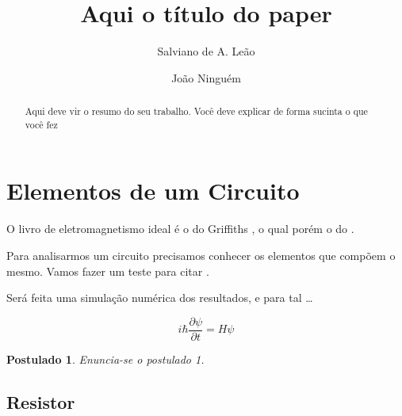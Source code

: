 \documentclass[10pt,a4paper,twocolumn,showkeys,showpacs,aps,groupedaddress,noeprint]{revtex4-1}
\newtheorem{postulado}{Postulado}
\begin{document}
\title{Aqui o título do paper}
\author{Salviano de A. Leão}
\author{João Ninguém}

\begin{abstract}
   Aqui deve vir o resumo do seu trabalho. Você deve explicar
   de forma sucinta o que você fez
\end{abstract}


\maketitle

\section{Elementos de um Circuito}

\lipsum[1]

O livro de eletromagnetismo ideal é o do Griffiths 
\cite{GriffithsEletro}, o qual porém o 
do \cite[ver pag.10]{Adams1992,Niguem2013}.

Para analisarmos\cite{Campos2001,Heath1997,Dahlquist1974} um circuito 
precisamos conhecer os elementos que compõem o
mesmo. Vamos fazer um teste para citar \cite{Tort2001,Adams1992}.

Será feita uma simulação numérica\cite{Conte1980} dos resultados, e
para tal \ldots

\begin{equation}\label{eq:Sch} 
   i \hbar \dfrac{\partial \psi}{\partial t} = H \psi
\end{equation} 

\begin{postulado}
   Enuncia-se o postulado 1. \lipsum[2]
\end{postulado}


\subsection{Resistor}
\end{document}
